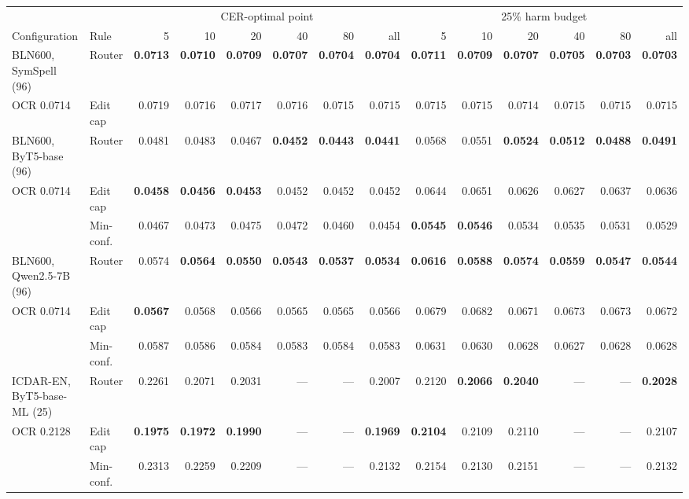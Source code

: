\begin{tabular}{llrrrrrr@{\hskip 10pt}rrrrrr}
\toprule
 & & \multicolumn{6}{c}{CER-optimal point} & \multicolumn{6}{c}{25\% harm budget} \\
\cmidrule(lr){3-8}\cmidrule(lr){9-14}
Configuration & Rule & 5 & 10 & 20 & 40 & 80 & all & 5 & 10 & 20 & 40 & 80 & all \\
\midrule
BLN600, SymSpell (96) & Router & \textbf{0.0713} & \textbf{0.0710} & \textbf{0.0709} & \textbf{0.0707} & \textbf{0.0704} & \textbf{0.0704} & \textbf{0.0711} & \textbf{0.0709} & \textbf{0.0707} & \textbf{0.0705} & \textbf{0.0703} & \textbf{0.0703} \\
\quad OCR 0.0714 & Edit cap & 0.0719 & 0.0716 & 0.0717 & 0.0716 & 0.0715 & 0.0715 & 0.0715 & 0.0715 & 0.0714 & 0.0715 & 0.0715 & 0.0715 \\
\addlinespace[2pt]
BLN600, ByT5-base (96) & Router & 0.0481 & 0.0483 & 0.0467 & \textbf{0.0452} & \textbf{0.0443} & \textbf{0.0441} & 0.0568 & 0.0551 & \textbf{0.0524} & \textbf{0.0512} & \textbf{0.0488} & \textbf{0.0491} \\
\quad OCR 0.0714 & Edit cap & \textbf{0.0458} & \textbf{0.0456} & \textbf{0.0453} & 0.0452 & 0.0452 & 0.0452 & 0.0644 & 0.0651 & 0.0626 & 0.0627 & 0.0637 & 0.0636 \\
 & Min-conf. & 0.0467 & 0.0473 & 0.0475 & 0.0472 & 0.0460 & 0.0454 & \textbf{0.0545} & \textbf{0.0546} & 0.0534 & 0.0535 & 0.0531 & 0.0529 \\
\addlinespace[2pt]
BLN600, Qwen2.5-7B (96) & Router & 0.0574 & \textbf{0.0564} & \textbf{0.0550} & \textbf{0.0543} & \textbf{0.0537} & \textbf{0.0534} & \textbf{0.0616} & \textbf{0.0588} & \textbf{0.0574} & \textbf{0.0559} & \textbf{0.0547} & \textbf{0.0544} \\
\quad OCR 0.0714 & Edit cap & \textbf{0.0567} & 0.0568 & 0.0566 & 0.0565 & 0.0565 & 0.0566 & 0.0679 & 0.0682 & 0.0671 & 0.0673 & 0.0673 & 0.0672 \\
 & Min-conf. & 0.0587 & 0.0586 & 0.0584 & 0.0583 & 0.0584 & 0.0583 & 0.0631 & 0.0630 & 0.0628 & 0.0627 & 0.0628 & 0.0628 \\
\addlinespace[2pt]
ICDAR-EN, ByT5-base-ML (25) & Router & 0.2261 & 0.2071 & 0.2031 & — & — & 0.2007 & 0.2120 & \textbf{0.2066} & \textbf{0.2040} & — & — & \textbf{0.2028} \\
\quad OCR 0.2128 & Edit cap & \textbf{0.1975} & \textbf{0.1972} & \textbf{0.1990} & — & — & \textbf{0.1969} & \textbf{0.2104} & 0.2109 & 0.2110 & — & — & 0.2107 \\
 & Min-conf. & 0.2313 & 0.2259 & 0.2209 & — & — & 0.2132 & 0.2154 & 0.2130 & 0.2151 & — & — & 0.2132 \\

\end{tabular}
